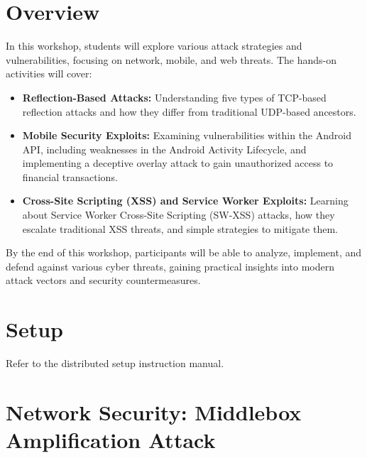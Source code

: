 \documentclass[letterpaper,12pt]{report}
\newcounter{taskset}
\newcounter{action}[taskset]
\begin{document}
\clearpage
{}
\settableofcontents
\tableofcontents
\clearpage

\newpage

\section*{Overview}\label{sec:work-carried-out-2}

In this workshop, students will explore various attack strategies and vulnerabilities, focusing on network, mobile, and web threats. The hands-on activities will cover:

\begin{itemize}
    \item \textbf{Reflection-Based Attacks:} Understanding five types of TCP-based reflection attacks and how they differ from traditional UDP-based ancestors.
    \item \textbf{Mobile Security Exploits:} Examining vulnerabilities within the Android API, including weaknesses in the Android Activity Lifecycle, and implementing a deceptive overlay attack to gain unauthorized access to financial transactions.
    \item \textbf{Cross-Site Scripting (XSS) and Service Worker Exploits:} Learning about Service Worker Cross-Site Scripting (SW-XSS) attacks, how they escalate traditional XSS threats, and simple strategies to mitigate them.
\end{itemize}

By the end of this workshop, participants will be able to analyze, implement, and defend against various cyber threats, gaining practical insights into modern attack vectors and security countermeasures.


\section*{Setup}\label{sec:Setup}

Refer to the distributed setup instruction manual.

\newpage
\section*{Network Security: Middlebox Amplification Attack}
\end{document}
